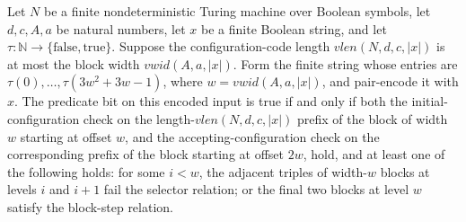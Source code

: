 \begin{theorem}
\label{Complexity.TQBFHard.predB_iff}
\leanok
{}
Let $N$ be a finite nondeterministic Turing machine over Boolean symbols, let $d,c,A,a$
be natural numbers, let $x$ be a finite Boolean string, and let
$\tau:\mathbb{N}\to\{\mathrm{false},\mathrm{true}\}$. Suppose the configuration-code
length $vlen(N,d,c,|x|)$ is at most the block width $vwid(A,a,|x|)$. Form the finite
string whose entries are $\tau(0),\ldots,\tau(3w^2+3w-1)$, where $w=vwid(A,a,|x|)$, and
pair-encode it with $x$. The predicate bit on this encoded input is true if and only if
both the initial-configuration check on the length-$vlen(N,d,c,|x|)$ prefix of the block
of width $w$ starting at offset $w$, and the accepting-configuration check on the
corresponding prefix of the block starting at offset $2w$, hold, and at least one of the
following holds: for some $i<w$, the adjacent triples of width-$w$ blocks at levels $i$
and $i+1$ fail the selector relation; or the final two blocks at level $w$ satisfy the
block-step relation.
\end{theorem}
